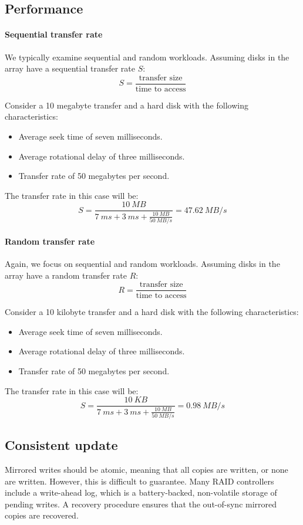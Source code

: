 \subsection{Performance}
\paragraph*{Sequential transfer rate}
We typically examine sequential and random workloads. 
Assuming disks in the array have a sequential transfer rate $S$:
\[S=\dfrac{\text{transfer size}}{\text{time to access}}\]
\begin{example}
    Consider a 10 megabyte transfer and a hard disk with the following characteristics:
    \begin{itemize}
        \item Average seek time of seven milliseconds.
        \item Average rotational delay of three milliseconds.
        \item Transfer rate of 50 megabytes per second.
    \end{itemize}
    The transfer rate in this case will be:
    \[S=\dfrac{10\:MB}{7\:ms+3\:ms+\frac{10\:MB}{50\:MB/s}}= 47.62\:MB/s\]
\end{example}

\paragraph*{Random transfer rate}
Again, we focus on sequential and random workloads. 
Assuming disks in the array have a random transfer rate $R$:
\[R=\dfrac{\text{transfer size}}{\text{time to access}}\]
\begin{example}
    Consider a 10 kilobyte transfer and a hard disk with the following characteristics:
    \begin{itemize}
        \item Average seek time of seven milliseconds.
        \item Average rotational delay of three milliseconds.
        \item Transfer rate of 50 megabytes per second.
    \end{itemize}
    The transfer rate in this case will be:
    \[S=\dfrac{10\:KB}{7\:ms+3\:ms+\frac{10\:MB}{50\:MB/s}}= 0.98\: MB/s\]
\end{example}

\subsection{Consistent update}
Mirrored writes should be atomic, meaning that all copies are written, or none are written.
However, this is difficult to guarantee. Many RAID controllers include a write-ahead log, which is a battery-backed, non-volatile storage of pending writes. 
A recovery procedure ensures that the out-of-sync mirrored copies are recovered.

